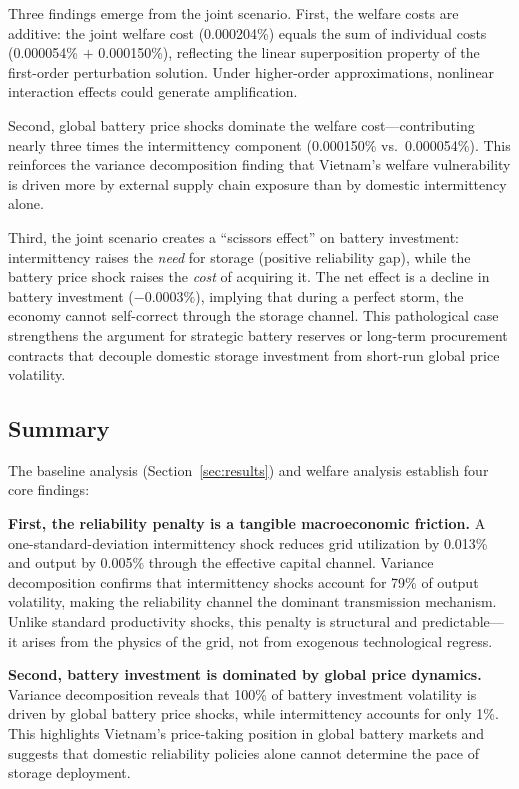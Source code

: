 \documentclass[12pt, a4paper]{article}
\begin{document}
Three findings emerge from the joint scenario. First, the welfare costs are additive: the joint welfare cost (0.000204\%) equals the sum of individual costs (0.000054\% $+$ 0.000150\%), reflecting the linear superposition property of the first-order perturbation solution. Under higher-order approximations, nonlinear interaction effects could generate amplification.

Second, global battery price shocks dominate the welfare cost---contributing nearly three times the intermittency component (0.000150\% vs.\ 0.000054\%). This reinforces the variance decomposition finding that Vietnam's welfare vulnerability is driven more by external supply chain exposure than by domestic intermittency alone.

Third, the joint scenario creates a ``scissors effect'' on battery investment: intermittency raises the \textit{need} for storage (positive reliability gap), while the battery price shock raises the \textit{cost} of acquiring it. The net effect is a decline in battery investment ($-0.0003\%$), implying that during a perfect storm, the economy cannot self-correct through the storage channel. This pathological case strengthens the argument for strategic battery reserves or long-term procurement contracts that decouple domestic storage investment from short-run global price volatility.

\subsection{Summary}

The baseline analysis (Section~\ref{sec:results}) and welfare analysis establish four core findings:

\textbf{First, the reliability penalty is a tangible macroeconomic friction.} A one-standard-deviation intermittency shock reduces grid utilization by 0.013\% and output by 0.005\% through the effective capital channel. Variance decomposition confirms that intermittency shocks account for 79\% of output volatility, making the reliability channel the dominant transmission mechanism. Unlike standard productivity shocks, this penalty is structural and predictable---it arises from the physics of the grid, not from exogenous technological regress.

\textbf{Second, battery investment is dominated by global price dynamics.} Variance decomposition reveals that 100\% of battery investment volatility is driven by global battery price shocks, while intermittency accounts for only 1\%. This highlights Vietnam's price-taking position in global battery markets and suggests that domestic reliability policies alone cannot determine the pace of storage deployment.
\end{document}
